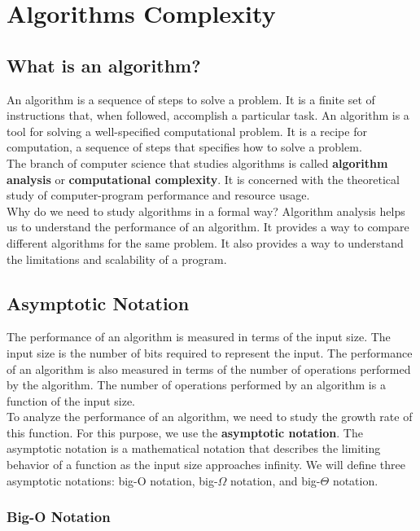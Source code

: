 \chapter{Algorithms Complexity}

\section{What is an algorithm?}

An algorithm is a sequence of steps to solve a problem. It is a finite set 
of instructions that, when followed, accomplish a particular task. An 
algorithm is a tool for solving a well-specified computational problem. 
It is a recipe for computation, a sequence of steps that specifies how to 
solve a problem.\\

The branch of computer science that studies algorithms is called
\textbf{algorithm analysis} or \textbf{computational complexity}. It is
concerned with the theoretical study of computer-program performance and
resource usage.\\

Why do we need to study algorithms in a formal way? Algorithm analysis helps us
to understand the performance of an algorithm. It provides a way to compare
different algorithms for the same problem. It also provides a way to understand
the limitations and scalability of a program.

\section{Asymptotic Notation}

The performance of an algorithm is measured in terms of the input size. The
input size is the number of bits required to represent the input. The
performance of an algorithm is also measured in terms of the number of
operations performed by the algorithm. The number of operations performed by an
algorithm is a function of the input size.\\

To analyze the performance of an algorithm, we need to study the growth rate of
this function. For this purpose, we use the \textbf{asymptotic notation}. The
asymptotic notation is a mathematical notation that describes the limiting
behavior of a function as the input size approaches infinity. We will define
three asymptotic notations: big-O notation, big-$\Omega$ notation, and
big-$\Theta$ notation.

\subsection{Big-O Notation}

